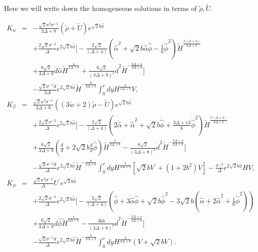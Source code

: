\documentclass[a4paper,11pt]{article}
\begin{document}
Here we will write down the homogeneous solutions in terms of 
$\tilde{\rho}, \tilde{U}$.  

\begin{eqnarray}
K_{\alpha} &=& -\frac{\sqrt{2}\kappa^2 \sigma^{-1}}{3\Delta +8}
(\tilde{\rho}+\tilde{U}) e^{\sqrt{2}b\hat{\phi}} \nonumber \\ 
& &+\frac{2\sqrt{2}\sigma^{-2}}{\Delta} e^{2\sqrt{2}b\hat{\phi}}
\Bigg[
-\frac{2\sqrt{2}}{(\Delta +4)}
\left(
\dot{\hat{\alpha}}^2
+\sqrt{2}b\dot{\hat{\alpha}}\dot{\hat{\phi}}
-\frac{1}{6}\dot{\hat{\phi}}^2
\right) \tilde{H}^{\frac{3(\Delta +4)}{3\Delta +8}} \nonumber \\
& &
+\frac{6\sqrt{2}}{3\Delta +8}
\dot{d}\dot{\hat{\alpha}} \tilde{H}^{\frac{4}{3\Delta +8}}
+\frac{6\sqrt{2}}{(3\Delta +8)^2}
\dot{d}^2  \tilde{H}^{-\frac{3\Delta +4}{3\Delta +8}} 
\Bigg] \nonumber \\
& &-\frac{\sqrt{2}\sigma^{-1}d}{3\Delta}e^{2\sqrt{2}b\hat{\phi}}
\tilde{H}^{-\frac{8}{3\Delta +8}}
\int_0^r dy H^{\frac{8}{3\Delta +8}} V,   \\ 
K_{\beta} &=& \frac{\sqrt{2}\kappa^2 \sigma^{-1}}{3\Delta +8}
((3\tilde{w}+2)\tilde{\rho}-\tilde{U}) e^{\sqrt{2}b\hat{\phi}} \nonumber \\
& &+\frac{2\sqrt{2}\sigma^{-2}}{\Delta} e^{2\sqrt{2}b\hat{\phi}}
\Bigg[
-\frac{2\sqrt{2}}{(\Delta +4)}
\left(
2\ddot{\hat{\alpha}}
+\dot{\hat{\alpha}}^2
+\sqrt{2}b\ddot{\hat{\phi}}
+\frac{3\Delta +13}{6}\dot{\hat{\phi}}^2
\right) \tilde{H}^{\frac{3(\Delta +4)}{3\Delta +8}} \nonumber \\
& &
+\frac{6\sqrt{2}}{3\Delta +8}
\left(
\frac{\ddot{d}}{d}+2\sqrt{2}b\frac{\dot{d}}{d}\dot{\hat{\phi}}
\right) \tilde{H}^{\frac{4}{3\Delta +8}}
-\frac{6\sqrt{2}}{(3\Delta +8)^2}
\dot{d}^2  \tilde{H}^{-\frac{3\Delta +4}{3\Delta +8}} 
\Bigg] \nonumber \\
& &-\frac{\sqrt{2}\sigma^{-1}d}{\Delta}e^{2\sqrt{2}b\hat{\phi}}
\tilde{H}^{-\frac{8}{3\Delta +8}}
\int_0^r dy H^{\frac{8}{3\Delta +8}} 
\left[
\sqrt{2}b V^{\prime} +(1+2b^2) V
\right]
-\frac{\sigma^{-2}}{\Delta}e^{2\sqrt{2}b\phi}H V, \\ 
K_{\phi} &=& \frac{\sqrt{2}\kappa^2 \sigma^{-1}}{\Delta}
U^{\prime}e^{\sqrt{2}b\hat{\phi}} \\
& &+\frac{2\sqrt{2}\sigma^{-2}}{\Delta} e^{2\sqrt{2}b\hat{\phi}}
\Bigg[
-\frac{2\sqrt{2}}{(\Delta +4)}
\left(
\ddot{\hat{\phi}}
+3\dot{\hat{\alpha}}\dot{\hat{\phi}}
+\sqrt{2}b\dot{\hat{\phi}}^2
-3\sqrt{2}b
\left( 
\ddot{\hat{\alpha}}
+2\dot{\hat{\alpha}}^2
+\frac{1}{6}\dot{\hat{\phi}}^2 
\right)
\right) \nonumber \\
& &+\frac{6\sqrt{2}}{3\Delta +8}
\dot{d}\dot{\hat{\phi}}\tilde{H}^{\frac{4}{3\Delta +8}}
-\frac{36b}{(3\Delta +8)^2}
\dot{d}^2  \tilde{H}^{-\frac{3\Delta +4}{3\Delta +8}} 
\Bigg] \nonumber \\
& &-\frac{\sqrt{2}\sigma^{-1}d}{\Delta}e^{2\sqrt{2}b\hat{\phi}}
\tilde{H}^{-\frac{8}{3\Delta +8}}
\int_0^r dy H^{\frac{8}{3\Delta +8}} (V+\sqrt{2}bV). 
\end{eqnarray}
\end{document}
